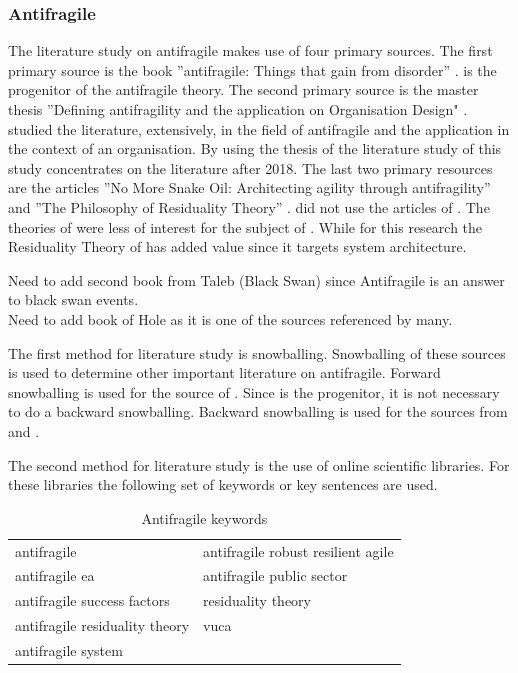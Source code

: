\subsubsection{Antifragile}
\label{subsub:antifragile}
The literature study on \gls{antifragile} makes use of four primary sources. The first primary source is the book ''\Gls{antifragile}: Things that gain from disorder'' \parencite{Taleb2012}. \textcite{Taleb2012} is the progenitor of the \gls{antifragile} theory. The second primary source is the master thesis ''Defining \Gls{antifragility} and the application on Organisation Design" \parencite{Botjes2020}. \citeauthor{Botjes2020} studied the literature, extensively, in the field of \gls{antifragile} and the application in the context of an organisation. By using the thesis of \citeauthor{Botjes2020} the literature study of this study concentrates on the literature after 2018. The last two primary resources are the articles ''No More Snake Oil: Architecting \Gls{agility} through \Gls{antifragility}'' and ''The Philosophy of Residuality Theory'' \parencite{OReilly2019,OReilly2021}. \textcite{Botjes2020} did not use the articles of \citeauthor{OReilly2019}. The theories of \citeauthor{OReilly2019} were less of interest for the subject of \citeauthor{Botjes2020}. While for this research the Residuality Theory of \textcite{OReilly2021} has added value since it targets system architecture.

\begin{remark}
	Need to add second book from Taleb (Black Swan) since Antifragile is an answer to black swan events.\\
	Need to add book of Hole as it is one of the sources referenced by many.
\end{remark}

The first method for literature study is snowballing. Snowballing of these sources is used to determine other important literature on \gls{antifragile}. Forward snowballing is used for the source of \citeauthor{Taleb2012}. Since \citeauthor{Taleb2012} is the progenitor, it is not necessary to do a backward snowballing. Backward snowballing is used for the sources from \citeauthor{Botjes2020} and \citeauthor{OReilly2019}.

The second method for literature study is the use of online scientific libraries. For these libraries the following set of keywords or key sentences are used.
\bigskip

\begin{table}[H]
	\centering
\begin{tabular}{p{}p{}}
	\toprule
	\gls{antifragile}	& \gls{antifragile} \gls{robust} \gls{resilient} \gls{agile}\\%
	\gls{antifragile} \acrlong{ea}	& \gls{antifragile} public sector\\%
	\gls{antifragile} success factors & residuality theory\\%
	\gls{antifragile} residuality theory & \acrlong{vuca} \\%
	\gls{antifragile} system & \\%
	\bottomrule
\end{tabular}
	\caption{Antifragile keywords}
\end{table}


